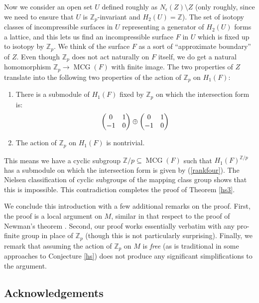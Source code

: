 \documentclass[12pt]{article}
\theoremstyle{plain}
\theoremstyle{definition}
\theoremstyle{remark}
\numberwithin{equation}{section}
\begin{document}
Now we consider an open set $U$ defined roughly as $N_\epsilon(Z)\setminus Z$ (only roughly, since we need to ensure that $U$ is $\mathbb Z_p$-invariant and $H_2(U)=\mathbb Z$).  The set of isotopy classes of incompressible surfaces in $U$ representing a generator of $H_2(U)$ forms a lattice, and this lets us find an incompressible surface $F$ in $U$ which is fixed up to isotopy by $\mathbb Z_p$.  We think of the surface $F$ as a sort of ``approximate boundary'' of $Z$.  Even though $\mathbb Z_p$ does not act naturally on $F$ itself, we do get a natural homomorphism $\mathbb Z_p\to\operatorname{MCG}(F)$ with finite image.  The two properties of $Z$ translate into the following two properties of the action of $\mathbb Z_p$ on $H_1(F)$:
\begin{enumerate}
\item There is a submodule of $H_1(F)$ fixed by $\mathbb Z_p$ on which the intersection form is:
\begin{equation}\label{rankfour}
\left(\begin{matrix}0&1\cr-1&0\end{matrix}\right)\oplus\left(\begin{matrix}0&1\cr-1&0\end{matrix}\right)
\end{equation}
\item The action of $\mathbb Z_p$ on $H_1(F)$ is nontrivial.
\end{enumerate}
This means we have a cyclic subgroup $\mathbb Z/p\subseteq\operatorname{MCG}(F)$ such that $H_1(F)^{\mathbb Z/p}$ has a submodule on which the intersection form is given by (\ref{rankfour}).  The Nielsen classification of cyclic subgroups of the mapping class group shows that this is impossible.  This contradiction completes the proof of Theorem \ref{hs3}.

We conclude this introduction with a few additional remarks on the proof.  First, the proof is a local argument on $M$, similar in that respect to the proof of Newman's theorem \cite{newman}.  Second, our proof works essentially verbatim with any pro-finite group in place of $\mathbb Z_p$ (though this is not particularly surprising).  Finally, we remark that assuming the action of $\mathbb Z_p$ on $M$ is \emph{free} (as is traditional in some approaches to Conjecture \ref{hs}) does not produce any significant simplifications to the argument.

\subsection{Acknowledgements}
\end{document}
